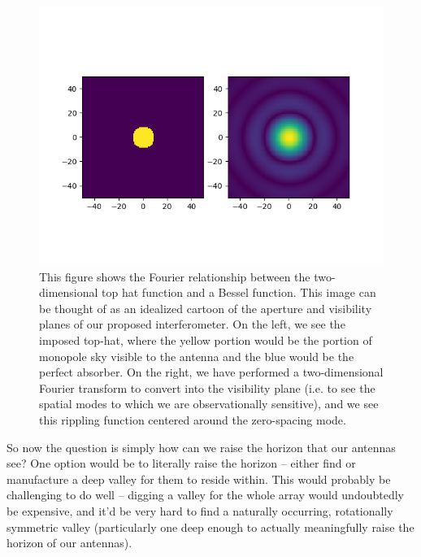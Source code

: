 \begin{figure}
    \begin{center}
    \includegraphics[width=\linewidth]{top-hat-bessel.png}
    \end{center}
    \caption{
        This figure shows the Fourier relationship between the two-dimensional 
        top hat function and a Bessel function. This image can be thought of as 
        an idealized cartoon of the aperture and visibility planes of our 
        proposed interferometer. On the left, we see the imposed top-hat, where 
        the yellow portion would be the portion of monopole sky visible to the 
        antenna and the blue would be the perfect absorber. On the right, we 
        have performed a two-dimensional Fourier transform to convert into the 
        visibility plane (i.e. to see the spatial modes to which we are 
        observationally sensitive), and we see this rippling function centered 
        around the zero-spacing mode.
    }
    \label{fig:sinc}
\end{figure}

So now the question is simply how can we raise the horizon that our antennas 
see? One option would be to literally raise the horizon -- either find or 
manufacture a deep valley for them to reside within. This would probably be 
challenging to do well -- digging a valley for the whole array would 
undoubtedly be expensive, and it'd be very hard to find a naturally occurring, 
rotationally symmetric valley (particularly one deep enough to actually 
meaningfully raise the horizon of our antennas).

